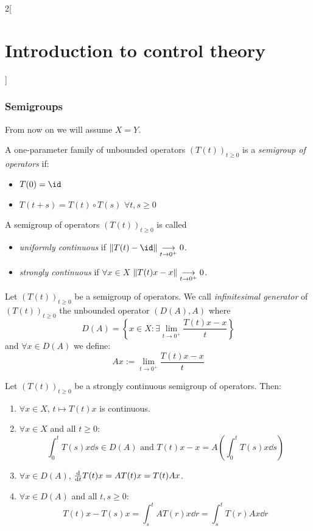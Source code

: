\documentclass[../../../main_math.tex]{subfiles}
\begin{document}
\begin{multicols}{2}[\section{Introduction to control theory}]
  \subsubsection{Semigroups}
  From now on we will assume $X=Y$.
  \begin{definition}\label{ICT:semigroup}
    A one-parameter family of unbounded operators $(T(t))_{t\geq 0}$ is a \emph{semigroup of operators} if:
    \begin{itemize}
      \item $T(0)=\id$
      \item $T(t+s)=T(t)\circ T(s)$ $\forall t,s\geq 0$
    \end{itemize}
  \end{definition}
  \begin{definition}
    A semigroup of operators $(T(t))_{t\geq 0}$ is called
    \begin{itemize}
      \item \emph{uniformly continuous} if $\norm{T(t)-\id} \underset{t\to 0^+}{\longrightarrow} 0$.
      \item \emph{strongly continuous} if $\forall x\in X$ $\norm{T(t)x-x}\underset{t\to 0^+}{\longrightarrow} 0$.
    \end{itemize}
  \end{definition}
  \begin{definition}
    Let $(T(t))_{t\geq 0}$ be a semigroup of operators. We call \emph{infinitesimal generator} of $(T(t))_{t\geq 0}$ the unbounded operator $(D(A),A)$ where
    $$
      D(A)=\left\{ x\in X:\exists \lim_{t\to 0^+}\frac{T(t)x-x}{t}\right\}
    $$
    and $\forall x\in D(A)$ we define:
    $$
      Ax:=\lim_{t\to 0^+}\frac{T(t)x-x}{t}
    $$
  \end{definition}
  \begin{proposition}
    Let $(T(t))_{t\geq 0}$ be a strongly continuous semigroup of operators. Then:
    \begin{enumerate}
      \item $\forall x\in X$, $t\mapsto T(t)x$ is continuous.
      \item\label{ICT:item2} $\forall x\in X$ and all $t\geq 0$:
            $$
              \int_0^t T(s)x\dd s\in\! D(A)\text{ and } T(t)x-x=A\!\left( \int_0^t\! T(s)x\dd s\!\right)
            $$
      \item $\forall x\in D(A)$, $\dv{}{t}T(t)x=AT(t)x=T(t)Ax$.
      \item $\forall x\in D(A)$ and all $t,s\geq 0$:
            $$
              T(t)x-T(s)x=\int_s^tA T(r)x\dd r=\int_s^t T(r)Ax\dd r
$$
\end{enumerate}
\end{proposition}
\end{multicols}
\end{document}
